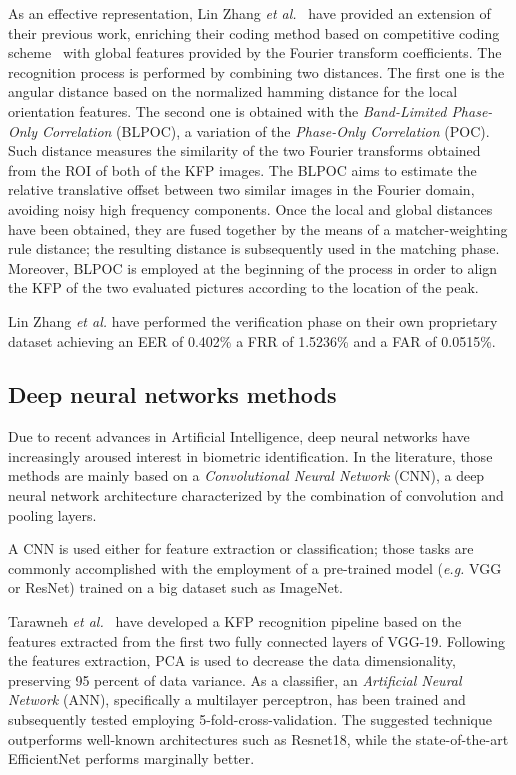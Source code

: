 \documentclass[journal]{IEEEtran}
\begin{document}
As an effective representation, Lin Zhang \textit{et al.}~\cite{ZHANG20111990} have provided an extension of their previous work, enriching their coding method based on competitive coding scheme~\cite{Zhang1} with global features provided by the Fourier transform coefficients. The recognition process is performed by combining two distances. The first one is the angular distance based on the normalized hamming distance for the local orientation features. The second one is obtained with the \emph{Band-Limited Phase-Only Correlation} (BLPOC), a variation of the \emph{Phase-Only Correlation} (POC). Such distance measures the similarity of the two Fourier transforms obtained from the ROI of both of the KFP images. The BLPOC aims to estimate the relative translative offset between two similar images in the Fourier domain, avoiding noisy high frequency components. Once the local and global distances have been obtained, they are fused together by the means of a matcher-weighting rule distance; the resulting distance is subsequently used in the matching phase. Moreover, BLPOC is employed at the beginning of the process in order to align the KFP of the two evaluated pictures according to the location of the peak.

Lin Zhang \textit{et al.} have performed the verification phase on their own proprietary dataset achieving an EER of 0.402\% a FRR of 1.5236\% and a FAR of 0.0515\%.

\subsection{Deep neural networks methods}
Due to recent advances in Artificial Intelligence, deep neural networks have increasingly aroused interest in biometric identification. In the literature, those methods are mainly based on a \emph{Convolutional Neural Network} (CNN), a deep neural network architecture characterized by the combination of convolution and pooling layers.

A CNN is used either for feature extraction or classification; those tasks are commonly accomplished with the employment of a pre-trained model (\textit{e.g.} VGG or ResNet) trained on a big dataset such as ImageNet.

Tarawneh \textit{et al.}~\cite{tarawneh2022deepknuckle} have developed a KFP recognition pipeline based on the features extracted from the first two fully connected layers of VGG-19.
Following the features extraction, PCA is used to decrease the data dimensionality, preserving 95 percent of data variance. As a classifier, an \emph{Artificial Neural Network} (ANN), specifically a multilayer perceptron, has been trained and subsequently tested employing 5-fold-cross-validation.
The suggested technique outperforms well-known architectures such as Resnet18, while the state-of-the-art EfficientNet performs marginally better.
\end{document}
